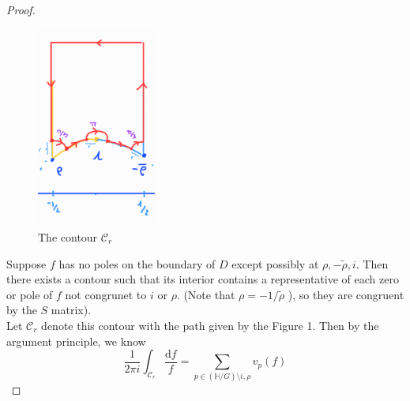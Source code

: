 \documentclass[12pt]{article}
\theoremstyle{definition}
\begin{document}
\begin{proof}~\\
    \begin{figure}[H]
        \centering
        \includegraphics[width=0.35\textwidth]{Fig1.png}
        \caption{The contour \(\mathcal{C}_r\) }
    \end{figure}
Suppose \(f\) has no poles on the boundary of \(D\) except possibly at \(\rho ,-\widetilde{\rho },i \). Then there exists a contour such that its interior contains a representative of each zero or pole of \(f\) not congrunet to \(i\) or \(\rho \). (Note that \(\rho = -1/\widetilde{\rho } \) ), so they are congruent by the \(S\) matrix). \\
Let \(\mathcal{C}_{r} \) denote this contour with the path given by the Figure 1. Then by the argument principle, we know 
\[
    \frac{1}{2\pi i}\int_{\mathcal{C}_{r}} \frac{\mathrm{d} f}{f} = \sum_{p\in (\mathbb{H}/G )\setminus {i,\rho } } v_p(f) 
\]


\end{proof}
\end{document}
